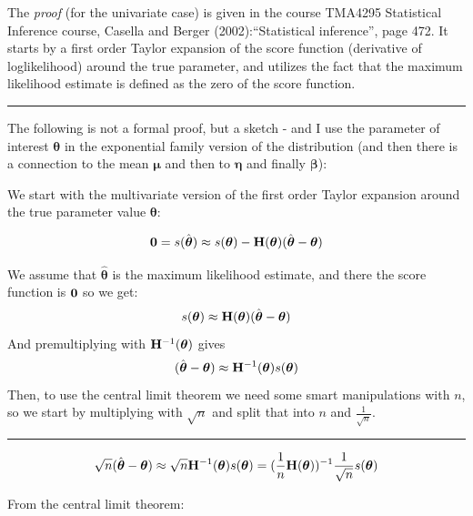 \documentclass[
]{article}
\begin{document}
The \emph{proof} (for the univariate case) is given in the course
TMA4295 Statistical Inference course, Casella and Berger
(2002):``Statistical inference'', page 472. It starts by a first order
Taylor expansion of the score function (derivative of loglikelihood)
around the true parameter, and utilizes the fact that the maximum
likelihood estimate is defined as the zero of the score function.

\begin{center}\rule{0.5\linewidth}{0.5pt}\end{center}

The following is not a formal proof, but a sketch - and I use the
parameter of interest \(\boldsymbol{\theta}\) in the exponential family
version of the distribution (and then there is a connection to the mean
\(\boldsymbol{\mu}\) and then to \(\boldsymbol{\eta}\) and finally
\(\boldsymbol{\beta}\)):

We start with the multivariate version of the first order Taylor
expansion around the true parameter value \(\boldsymbol{\theta}\):

\[{\bf 0}=s(\hat{\boldsymbol{\theta}})\approx s({\boldsymbol{\theta}})-{\bf H}({\boldsymbol{\theta}})(\hat{\boldsymbol{\theta}}-{\boldsymbol{\theta}})\]

We assume that \(\hat{\boldsymbol{\theta}}\) is the maximum likelihood
estimate, and there the score function is \({\bf 0}\) so we get:
\[s({\boldsymbol{\theta}})\approx {\bf H}({\boldsymbol{\theta}})(\hat{\boldsymbol{\theta}}-{\boldsymbol{\theta}})\]
And premultiplying with \({\bf H}^{-1}(\boldsymbol{\theta})\) gives
\[ (\hat{\boldsymbol{\theta}}-{\boldsymbol{\theta}})\approx {\bf H}^{-1}({\boldsymbol{\theta}})s({\boldsymbol{\theta}})\]
Then, to use the central limit theorem we need some smart manipulations
with \(n\), so we start by multiplying with \(\sqrt{n}\) and split that
into \(n\) and \(\frac{1}{\sqrt{n}}\).

\begin{center}\rule{0.5\linewidth}{0.5pt}\end{center}

\[ \sqrt{n}(\hat{\boldsymbol{\theta}}-{\boldsymbol{\theta}})\approx \sqrt{n}{\bf H}^{-1}({\boldsymbol{\theta}})s({\boldsymbol{\theta}})=(\frac{1}{n}{\bf H}({\boldsymbol{\theta}}))^{-1}\frac{1}{\sqrt{n}}s({\boldsymbol{\theta}})\]

From the central limit theorem:
\end{document}
